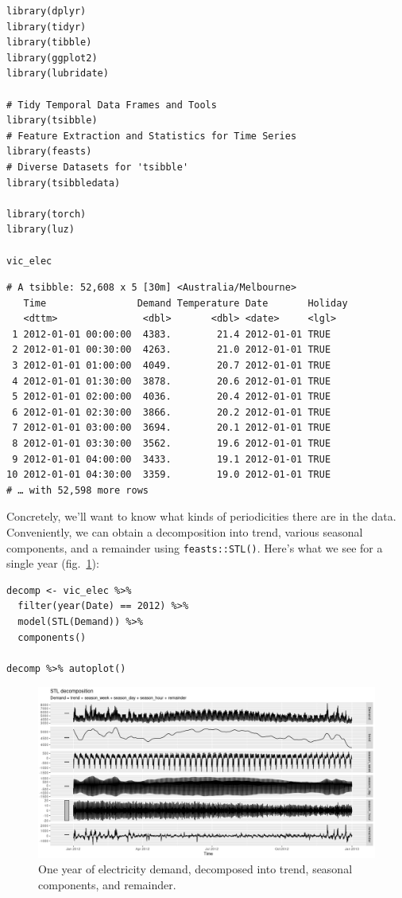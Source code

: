 \documentclass[
  letterpaper,
]{krantz}
\begin{document}
\begin{verbatim}
library(dplyr)
library(tidyr)
library(tibble)
library(ggplot2)
library(lubridate)

# Tidy Temporal Data Frames and Tools
library(tsibble) 
# Feature Extraction and Statistics for Time Series
library(feasts) 
# Diverse Datasets for 'tsibble'
library(tsibbledata) 

library(torch)
library(luz)

vic_elec
\end{verbatim}

\begin{verbatim}
# A tsibble: 52,608 x 5 [30m] <Australia/Melbourne>
   Time                Demand Temperature Date       Holiday
   <dttm>               <dbl>       <dbl> <date>     <lgl>  
 1 2012-01-01 00:00:00  4383.        21.4 2012-01-01 TRUE   
 2 2012-01-01 00:30:00  4263.        21.0 2012-01-01 TRUE   
 3 2012-01-01 01:00:00  4049.        20.7 2012-01-01 TRUE   
 4 2012-01-01 01:30:00  3878.        20.6 2012-01-01 TRUE   
 5 2012-01-01 02:00:00  4036.        20.4 2012-01-01 TRUE   
 6 2012-01-01 02:30:00  3866.        20.2 2012-01-01 TRUE   
 7 2012-01-01 03:00:00  3694.        20.1 2012-01-01 TRUE   
 8 2012-01-01 03:30:00  3562.        19.6 2012-01-01 TRUE   
 9 2012-01-01 04:00:00  3433.        19.1 2012-01-01 TRUE   
10 2012-01-01 04:30:00  3359.        19.0 2012-01-01 TRUE   
# … with 52,598 more rows
\end{verbatim}

Concretely, we'll want to know what kinds of periodicities there are in
the data. Conveniently, we can obtain a decomposition into trend,
various seasonal components, and a remainder using
\texttt{feasts::STL()}. Here's what we see for a single year
(fig.~\ref{fig-timeseries-vic-elec-stl}):

\begin{verbatim}
decomp <- vic_elec %>% 
  filter(year(Date) == 2012) %>%
  model(STL(Demand)) %>% 
  components()

decomp %>% autoplot()
\end{verbatim}

\begin{figure}[H]

{\centering \includegraphics{images/timeseries-vic-elec-stl.png}

}

\caption{\label{fig-timeseries-vic-elec-stl}One year of electricity
demand, decomposed into trend, seasonal components, and remainder.}

\end{figure}
\end{document}

